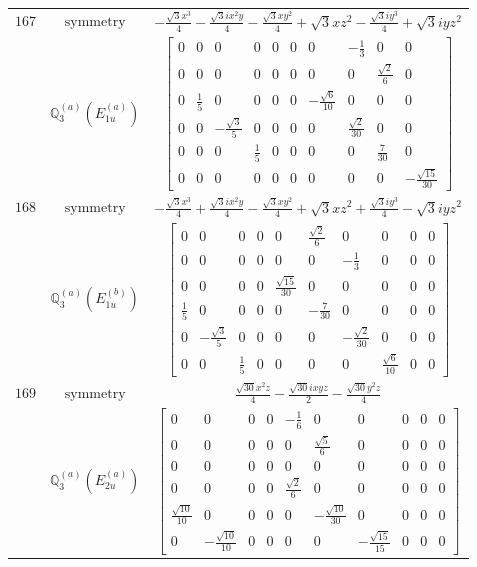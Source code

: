 \documentclass[fleqn,8pt,landscape]{jsarticle}
\begin{document}
\begin{longtable}{ccc}
$ 167 $ & $ \text{symmetry} $ & $ - \frac{\sqrt{3} x^{3}}{4} - \frac{\sqrt{3} i x^{2} y}{4} - \frac{\sqrt{3} x y^{2}}{4} + \sqrt{3} x z^{2} - \frac{\sqrt{3} i y^{3}}{4} + \sqrt{3} i y z^{2} $ \\
$  $ & $ \mathbb{Q}_{3}^{(a)}(E_{1u}^{(a)}) $ & $ \begin{bmatrix} 0 & 0 & 0 & 0 & 0 & 0 & 0 & - \frac{1}{3} & 0 & 0 \\ 0 & 0 & 0 & 0 & 0 & 0 & 0 & 0 & \frac{\sqrt{2}}{6} & 0 \\ 0 & \frac{1}{5} & 0 & 0 & 0 & 0 & - \frac{\sqrt{6}}{10} & 0 & 0 & 0 \\ 0 & 0 & - \frac{\sqrt{3}}{5} & 0 & 0 & 0 & 0 & \frac{\sqrt{2}}{30} & 0 & 0 \\ 0 & 0 & 0 & \frac{1}{5} & 0 & 0 & 0 & 0 & \frac{7}{30} & 0 \\ 0 & 0 & 0 & 0 & 0 & 0 & 0 & 0 & 0 & - \frac{\sqrt{15}}{30} \end{bmatrix} $ \\ \hline
$ 168 $ & $ \text{symmetry} $ & $ - \frac{\sqrt{3} x^{3}}{4} + \frac{\sqrt{3} i x^{2} y}{4} - \frac{\sqrt{3} x y^{2}}{4} + \sqrt{3} x z^{2} + \frac{\sqrt{3} i y^{3}}{4} - \sqrt{3} i y z^{2} $ \\
$  $ & $ \mathbb{Q}_{3}^{(a)}(E_{1u}^{(b)}) $ & $ \begin{bmatrix} 0 & 0 & 0 & 0 & 0 & \frac{\sqrt{2}}{6} & 0 & 0 & 0 & 0 \\ 0 & 0 & 0 & 0 & 0 & 0 & - \frac{1}{3} & 0 & 0 & 0 \\ 0 & 0 & 0 & 0 & \frac{\sqrt{15}}{30} & 0 & 0 & 0 & 0 & 0 \\ \frac{1}{5} & 0 & 0 & 0 & 0 & - \frac{7}{30} & 0 & 0 & 0 & 0 \\ 0 & - \frac{\sqrt{3}}{5} & 0 & 0 & 0 & 0 & - \frac{\sqrt{2}}{30} & 0 & 0 & 0 \\ 0 & 0 & \frac{1}{5} & 0 & 0 & 0 & 0 & \frac{\sqrt{6}}{10} & 0 & 0 \end{bmatrix} $ \\ \hline
$ 169 $ & $ \text{symmetry} $ & $ \frac{\sqrt{30} x^{2} z}{4} - \frac{\sqrt{30} i x y z}{2} - \frac{\sqrt{30} y^{2} z}{4} $ \\
$  $ & $ \mathbb{Q}_{3}^{(a)}(E_{2u}^{(a)}) $ & $ \begin{bmatrix} 0 & 0 & 0 & 0 & - \frac{1}{6} & 0 & 0 & 0 & 0 & 0 \\ 0 & 0 & 0 & 0 & 0 & \frac{\sqrt{5}}{6} & 0 & 0 & 0 & 0 \\ 0 & 0 & 0 & 0 & 0 & 0 & 0 & 0 & 0 & 0 \\ 0 & 0 & 0 & 0 & \frac{\sqrt{2}}{6} & 0 & 0 & 0 & 0 & 0 \\ \frac{\sqrt{10}}{10} & 0 & 0 & 0 & 0 & - \frac{\sqrt{10}}{30} & 0 & 0 & 0 & 0 \\ 0 & - \frac{\sqrt{10}}{10} & 0 & 0 & 0 & 0 & - \frac{\sqrt{15}}{15} & 0 & 0 & 0 \end{bmatrix} $ \\ \hline

\end{longtable}
\end{document}
